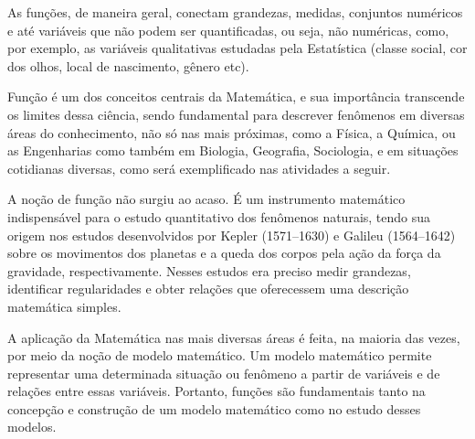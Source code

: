 \documentclass[extrafontsizes, twoside, 11pt, openright, final]{memoir}
\begin{document}
As funções, de maneira geral, conectam grandezas, medidas, conjuntos numéricos e até variáveis que não podem ser quantificadas, ou seja, não numéricas, como, por exemplo, as variáveis qualitativas estudadas pela Estatística (classe social, cor dos olhos, local de nascimento, gênero etc).

Função é um dos conceitos centrais da Matemática, e sua importância transcende os limites dessa ciência, sendo fundamental para descrever fenômenos em diversas áreas do conhecimento, não só nas mais próximas, como a Física, a Química, ou as Engenharias como também em Biologia, Geografia, Sociologia, e em situações cotidianas diversas, como será exemplificado nas atividades a seguir.

A noção de função não surgiu ao acaso. É um instrumento matemático indispensável para o estudo quantitativo dos fenômenos naturais, tendo sua origem nos estudos desenvolvidos por Kepler (1571--1630) e Galileu (1564--1642) sobre os movimentos dos planetas e a queda dos corpos pela ação da força da gravidade, respectivamente.  Nesses estudos era preciso medir grandezas, identificar regularidades e obter relações que oferecessem uma descrição matemática simples.

A aplicação da Matemática nas mais diversas áreas é feita, na maioria das vezes, por meio da noção de modelo matemático. Um modelo matemático permite representar uma determinada situação ou fenômeno a partir de variáveis e de relações entre essas variáveis. Portanto, funções são fundamentais tanto na concepção e construção de um modelo matemático como no estudo desses modelos.
\end{document}
